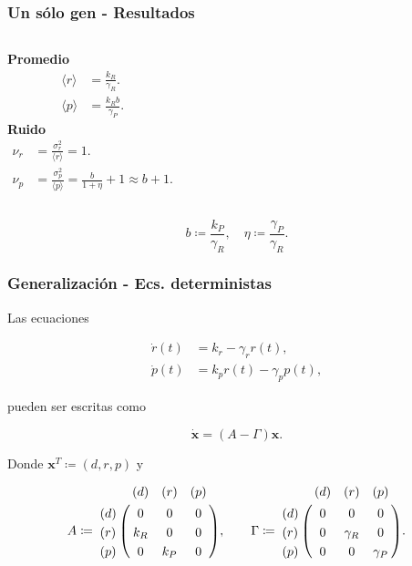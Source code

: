 \documentclass{beamer}
\begin{document}
\begin{frame}
\frametitle{Un s\'olo gen - Resultados}

\begin{columns}[c]
\centering \textbf{Promedio}
\begin{align*}
\langle r \rangle &= \frac{k_R}{\gamma_R}.\\[1.5ex]
\langle p \rangle &= \frac{k_Rb}{\gamma_P}.
\end{align*}
\centering \textbf{Ruido}
\begin{align*}
\nu_r &= \frac{\sigma_r^2}{\langle r \rangle} = 1.\\[1.5ex]
\nu_p &= \frac{\sigma_p^2}{\langle p \rangle} = \frac{b}{1+\eta} + 1 \approx b + 1.
\end{align*}
\end{columns}

\vspace{3 mm}

\begin{equation*}
b \coloneqq \frac{k_P}{\gamma_R}, \quad \eta \coloneqq \frac{\gamma_P}{\gamma_R}.
\end{equation*}

\end{frame}


\begin{frame}
\frametitle{Generalizaci\'on - Ecs. deterministas}

Las ecuaciones

\begin{align*}
\dot{r}(t) &= k_r - \gamma_rr(t),\\
\dot{p}(t) &= k_pr(t) - \gamma_pp(t),
\end{align*}

pueden ser escritas como

\begin{equation*}
\mathbf{\dot{x}} = (A - \Gamma)\mathbf{x}.
\end{equation*}

Donde $\mathbf{x}^T \coloneqq (d, r, p)$ y

\begin{align*}
A \coloneqq \bordermatrix{
  ~ & (d) & (r) & (p) \cr
  (d) & 0 & 0 & 0 \cr
  (r) & k_R & 0 & 0 \cr
  (p) & 0 & k_P & 0 \cr}, \quad \quad
\Gamma \coloneqq \bordermatrix{
  ~ & (d) & (r) & (p) \cr
  (d) & 0 & 0 & 0 \cr
  (r) & 0 & \gamma_R & 0 \cr
  (p) & 0 & 0 & \gamma_P \cr}.\\
\end{align*}
\end{frame}
\end{document}
